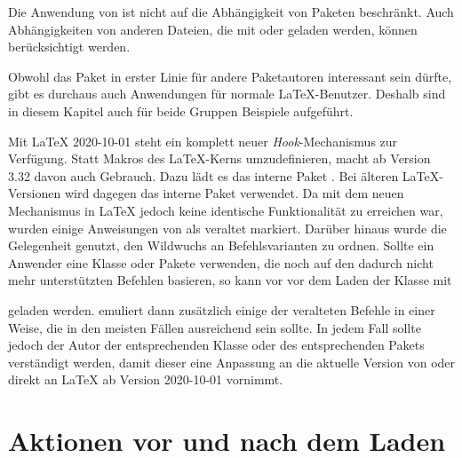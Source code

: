 Die Anwendung von  ist nicht auf die Abhängigkeit von
Paketen beschränkt. Auch Abhängigkeiten von anderen Dateien, die mit
 oder  geladen werden, können
berücksichtigt werden.%
\iffalse%
So kann beispielsweise dafür gesorgt werden, dass das nicht unkritische Laden
einer Datei wie \File{french.ldf} automatisch zu einer Warnung führt.%
\fi

Obwohl das Paket in erster Linie für andere Paketautoren interessant sein
dürfte, gibt es durchaus auch Anwendungen für normale \LaTeX-Benutzer. Deshalb
sind in diesem Kapitel auch für beide Gruppen Beispiele aufgeführt.

\begin{Declaration}
\end{Declaration}
Mit \LaTeX{} 2020-10-01 steht ein
komplett neuer \emph{Hook}-Mechanismus zur Verfügung. Statt Makros des
\LaTeX-Kerns umzudefinieren, macht  ab Version 3.32 davon
auch Gebrauch. Dazu lädt es das interne Paket
. Bei älteren
\LaTeX-Versionen wird dagegen das interne Paket
%
 verwendet. Da mit dem neuen
Mechanismus in \LaTeX{} jedoch keine identische Funktionalität zu erreichen
war, wurden einige Anweisungen von  als veraltet
markiert. Darüber hinaus wurde die Gelegenheit genutzt, den Wildwuchs an
Befehlsvarianten zu ordnen. Sollte ein Anwender eine Klasse oder Pakete
verwenden, die noch auf den dadurch nicht mehr unterstützten Befehlen
basieren, so kann vor  vor dem Laden der Klasse mit
\begin{lstcode}
  \RequirePackage[withdeprecated]{scrlfile}
\end{lstcode}
geladen werden.  emuliert dann zusätzlich einige der
veralteten Befehle in einer Weise, die in den meisten Fällen ausreichend sein
sollte. In jedem Fall sollte jedoch der Autor der entsprechenden Klasse oder
des entsprechenden Pakets verständigt werden, damit dieser eine Anpassung an
die aktuelle Version von  oder direkt an \LaTeX{} ab Version
2020-10-01 vornimmt.%
%
\EndIndexGroup


\section{Aktionen vor und nach dem Laden}

